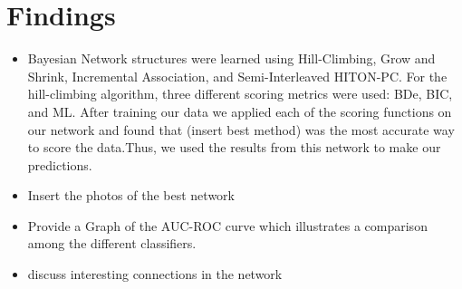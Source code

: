 \section{Findings}
\begin{itemize}
    \item Bayesian Network structures were learned using Hill-Climbing, Grow and Shrink, Incremental Association, and Semi-Interleaved HITON-PC. For the hill-climbing algorithm, three different scoring metrics were used: BDe, BIC, and ML. After training our data we applied each of the scoring functions on our network and found that (insert best method) was the most accurate way to score the data.Thus, we used the results from this network to make our predictions. 
    \item Insert the photos of the best network 
    \item Provide a Graph of the AUC-ROC curve which illustrates a comparison among the different classifiers.
    \item discuss interesting connections in the network
\end{itemize}